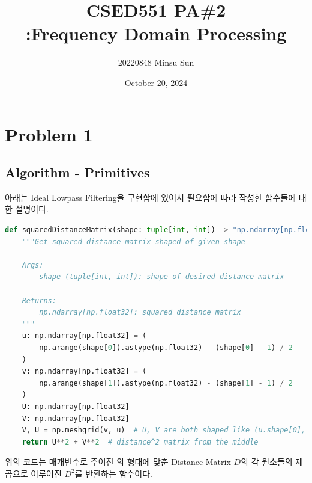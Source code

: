 \documentclass{report}
\title{CSED551 PA\#2 \\[0.5ex] {\normalsize :Frequency Domain Processing}}
\author{\small{20220848 Minsu Sun}}
\date{\small{October 20, 2024}}
\begin{document}
\maketitle

\section*{Problem 1}

\subsection*{Algorithm - Primitives}

아래는 Ideal Lowpass Filtering을 구현함에 있어서 필요함에 따라 작성한 함수들에 대한 설명이다.

\begin{lstlisting}[language=Python, caption=Primitive - squaredDistanceMatrix, firstnumber=7]
def squaredDistanceMatrix(shape: tuple[int, int]) -> "np.ndarray[np.float32]":
    """Get squared distance matrix shaped of given shape

    Args:
        shape (tuple[int, int]): shape of desired distance matrix

    Returns:
        np.ndarray[np.float32]: squared distance matrix
    """
    u: np.ndarray[np.float32] = (
        np.arange(shape[0]).astype(np.float32) - (shape[0] - 1) / 2
    )
    v: np.ndarray[np.float32] = (
        np.arange(shape[1]).astype(np.float32) - (shape[1] - 1) / 2
    )
    U: np.ndarray[np.float32]
    V: np.ndarray[np.float32]
    V, U = np.meshgrid(v, u)  # U, V are both shaped like (u.shape[0], v.shape[0])
    return U**2 + V**2  # distance^2 matrix from the middle
\end{lstlisting}

위의 코드는 매개변수로 주어진 의 형태에 맞춘 Distance Matrix $D$의 각 원소들의 제곱으로 이루어진 $D^2$를 반환하는 함수이다.
\end{document}
